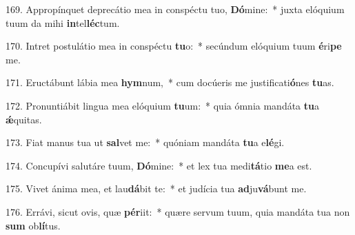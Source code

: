 169. Appropínquet deprecátio mea in conspéctu tuo, \textbf{Dó}mine:~*  juxta elóquium tuum da mihi \textbf{in}tel\textbf{léc}tum.\

170. Intret postulátio mea in conspéctu \textbf{tu}o:~*  secúndum elóquium tuum \textbf{é}ri\textbf{pe} me.\

171. Eructábunt lábia mea \textbf{hym}num,~*  cum docúeris me justificati\textbf{ó}nes \textbf{tu}as.\

172. Pronuntiábit lingua mea elóquium \textbf{tu}um:~*  quia ómnia mandáta \textbf{tu}a \textbf{ǽ}quitas.\

173. Fiat manus tua ut \textbf{sal}vet me:~*  quóniam mandáta \textbf{tu}a e\textbf{lé}gi.\

174. Concupívi salutáre tuum, \textbf{Dó}mine:~*  et lex tua medi\textbf{tá}tio \textbf{me}a est.\

175. Vivet ánima mea, et lau\textbf{dá}bit te:~*  et judícia tua \textbf{ad}ju\textbf{vá}bunt me.\

176. Errávi, sicut ovis, quæ \textbf{pér}iit:~*  quære servum tuum, quia mandáta tua non \textbf{sum} ob\textbf{lí}tus.\

